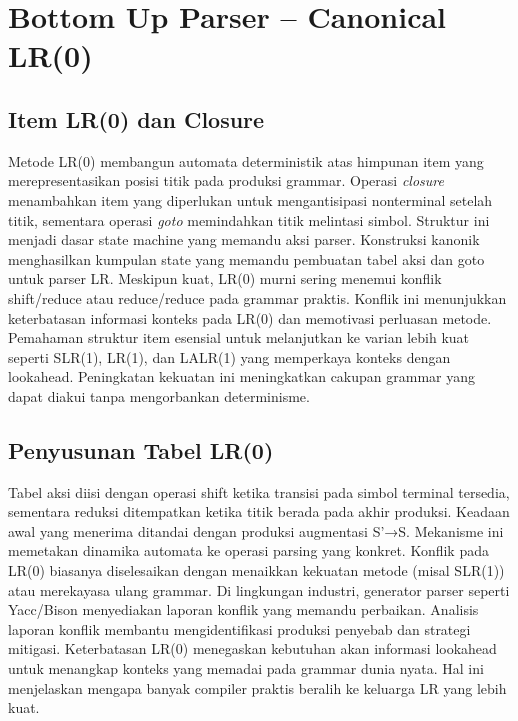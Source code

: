 \documentclass[../main.tex]{subfiles}
\begin{document}
\chapter{Bottom Up Parser – Canonical LR(0)}
\label{ch:lr0}

\section{Item LR(0) dan Closure}
Metode LR(0) membangun automata deterministik atas himpunan item yang merepresentasikan posisi titik pada produksi grammar. Operasi \textit{closure} menambahkan item yang diperlukan untuk mengantisipasi nonterminal setelah titik, sementara operasi \textit{goto} memindahkan titik melintasi simbol.\cite{aho-dragon-book-2006} Struktur ini menjadi dasar state machine yang memandu aksi parser.
Konstruksi kanonik menghasilkan kumpulan state yang memandu pembuatan tabel aksi dan goto untuk parser LR. Meskipun kuat, LR(0) murni sering menemui konflik shift/reduce atau reduce/reduce pada grammar praktis.\cite{grune-parsing} Konflik ini menunjukkan keterbatasan informasi konteks pada LR(0) dan memotivasi perluasan metode.
Pemahaman struktur item esensial untuk melanjutkan ke varian lebih kuat seperti SLR(1), LR(1), dan LALR(1) yang memperkaya konteks dengan lookahead. Peningkatan kekuatan ini meningkatkan cakupan grammar yang dapat diakui tanpa mengorbankan determinisme.

\section{Penyusunan Tabel LR(0)}
Tabel aksi diisi dengan operasi shift ketika transisi pada simbol terminal tersedia, sementara reduksi ditempatkan ketika titik berada pada akhir produksi. Keadaan awal yang menerima ditandai dengan produksi augmentasi S'→S.\cite{aho-dragon-book-2006} Mekanisme ini memetakan dinamika automata ke operasi parsing yang konkret.
Konflik pada LR(0) biasanya diselesaikan dengan menaikkan kekuatan metode (misal SLR(1)) atau merekayasa ulang grammar. Di lingkungan industri, generator parser seperti Yacc/Bison menyediakan laporan konflik yang memandu perbaikan.\cite{bison-manual} Analisis laporan konflik membantu mengidentifikasi produksi penyebab dan strategi mitigasi.
Keterbatasan LR(0) menegaskan kebutuhan akan informasi lookahead untuk menangkap konteks yang memadai pada grammar dunia nyata. Hal ini menjelaskan mengapa banyak compiler praktis beralih ke keluarga LR yang lebih kuat.

\IfSubfilesClassLoaded{%
\printbibliography
}{}
\end{document}
